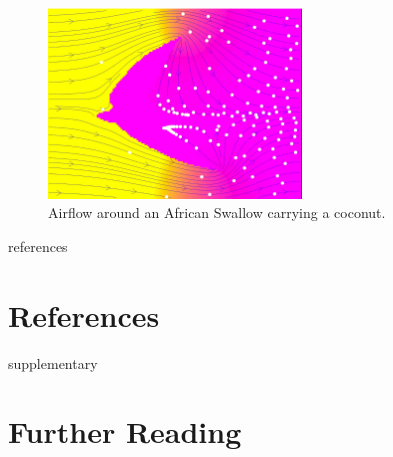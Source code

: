 \documentclass[11pt]{article}
\begin{document}
\begin{figure} [H] %
	\centering
	\includegraphics[width=0.6\textwidth]{swallow.png}
	\caption{Airflow around an African Swallow carrying a coconut.}
\end{figure}

\begin{btSect}[abbrvnat]{references}
   \section*{References}
   \btPrintCited
\end{btSect}
 
\begin{btSect}[plainnat]{supplementary}
   \section*{Further Reading}
   \btPrintAll%
\end{btSect}
\end{document}
